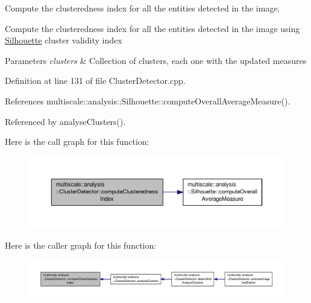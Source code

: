 Compute the clusteredness index for all the entities detected in the image. 

Compute the clusteredness index for all the entities detected in the image using \hyperlink{classmultiscale_1_1analysis_1_1Silhouette}{Silhouette} cluster validity index


\begin{DoxyParams}{Parameters}
{\em clusters} & Collection of clusters, each one with the updated measures \\
\hline
\end{DoxyParams}


Definition at line 131 of file Cluster\-Detector.\-cpp.



References multiscale\-::analysis\-::\-Silhouette\-::compute\-Overall\-Average\-Measure().



Referenced by analyse\-Clusters().



Here is the call graph for this function\-:\nopagebreak
\begin{figure}[H]
\begin{center}
\leavevmode
\includegraphics[width=350pt]{classmultiscale_1_1analysis_1_1ClusterDetector_aaa7937daf9872614e09b23cb4f6e5aa8_cgraph}
\end{center}
\end{figure}




Here is the caller graph for this function\-:\nopagebreak
\begin{figure}[H]
\begin{center}
\leavevmode
\includegraphics[width=350pt]{classmultiscale_1_1analysis_1_1ClusterDetector_aaa7937daf9872614e09b23cb4f6e5aa8_icgraph}
\end{center}
\end{figure}


